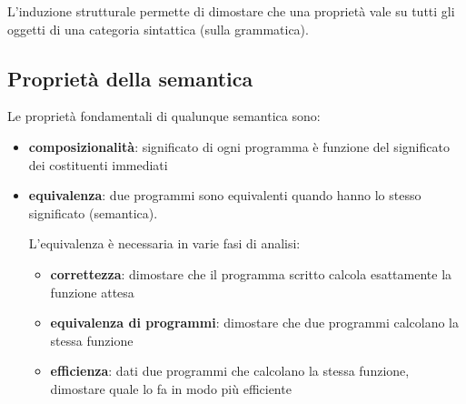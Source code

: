 L'induzione strutturale permette di dimostare che una proprietà vale su tutti gli oggetti di una categoria sintattica (sulla grammatica).


\subsection{Proprietà della semantica}
Le proprietà fondamentali di qualunque semantica sono:
\begin{itemize}[label=$\circ$, itemsep=\smallskipamount]
    \item \textbf{composizionalità}: significato di ogni programma è funzione del significato dei costituenti immediati
    \item \textbf{equivalenza}: due programmi sono equivalenti quando hanno lo stesso significato (semantica).
    
    L'equivalenza è necessaria in varie fasi di analisi:
    \begin{itemize}[itemsep=\smallskipamount]
        \item \textbf{correttezza}: dimostare che il programma scritto calcola esattamente la funzione attesa
        \item \textbf{equivalenza di programmi}: dimostare che due programmi calcolano la stessa funzione
        \item \textbf{efficienza}: dati due programmi che calcolano la stessa funzione, dimostare quale lo fa in modo più efficiente
    \end{itemize}
\end{itemize}

